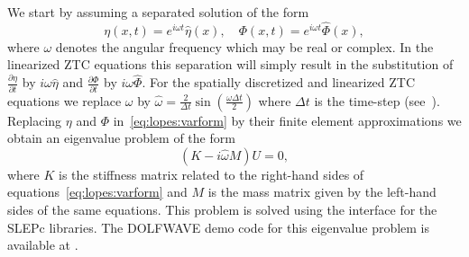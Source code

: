 We start by assuming a separated solution of the form
\begin{equation}
\label{eq:lopes:exp}
\eta(x,t)=e^{i\omega t}\hat\eta(x),\quad
\Phi(x,t)=e^{i\omega t}\hat\Phi(x),
\end{equation}
where $\omega$ denotes the angular frequency which may be real or
complex.  In the linearized ZTC equations this separation will simply
result in the substitution of $\frac{\partial \eta}{\partial t}$ by
$i\omega \hat\eta$ and $\frac{\partial \Phi}{\partial t}$ by $i\omega
\hat\Phi$.  For the spatially discretized and linearized ZTC equations
we replace $\omega$ by $\hat\omega=\frac{2}{\Delta
t}\sin\left(\frac{\omega \Delta t}{2}\right)$ where $\Delta t$ is the
time-step (see~\citet{LovholtPedersen2009}).  Replacing $\eta$ and
$\Phi$ in~\eqref{eq:lopes:varform} by their finite element
approximations we obtain an eigenvalue problem of the form
\begin{equation}
  \label{eq:lopes:eigenvalue}
(K- i\hat\omega M) U=0,
\end{equation}
where $K$ is the stiffness matrix related to the right-hand sides of
equations~\eqref{eq:lopes:varform} and $M$ is the mass matrix given by
the left-hand sides of the same equations.  This problem is solved
using the \dolfin interface for the SLEPc libraries.  The DOLFWAVE
demo code for this eigenvalue problem is available at
.

